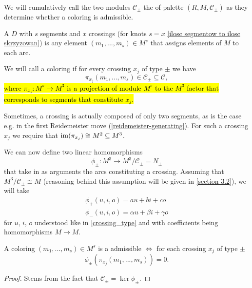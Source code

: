 We will cumulatively call the two modules $\mathcal{C}_\pm$ the  of palette $(R, M, \mathcal{C}_\pm)$ as they determine whether a coloring is admissible.

\begin{definition}
  A  $D$ with $s$ segments and $x$ crossings (for knots $s=x$ \cref{ilosc segmentow to ilosc skrzyzowan}) is any element $(m_1,..., m_s)\in M^s$ that assigns elements of $M$ to each arc. 

  We will call a coloring  if for every crossing $x_j$ of type $\pm$ we have 
  $$\pi_{x_j}(m_1,..., m_s)\in \mathcal{C}_\pm\subseteq\mathcal{C},$$
\hl{where $\pi_{x_j}:M^s\to M^3$ is a projection of module $M^s$ to the $M^3$ factor that corresponds to segments that constitute $x_j$.} 
\end{definition}

Sometimes, a crossing is actually composed of only two segments, as is the case e.g. in the first Reidemeister move (\cref{reidemeister-generating}). For such a crossing $x_j$ we require that $\operatorname{im}(\pi_{x_j})\cong M^2\subseteq M^3$.


We can now define two linear homomorphisms
$$\phi_\pm:M^3\to M^3/\mathcal{C}_\pm=N_\pm$$
that take in as arguments the arcs constituting a crossing. Assuming that $M^3/\mathcal{C}_\pm\cong M$ (reasoning behind this assumption will be given in \cref{section 3.2}), we will take 
\begin{align}
  \phi_+(u,i,o)=au+bi+co \label{phi equations1} \\ 
  \phi_-(u,i,o)=\alpha u+\beta i+\gamma o \label{phi equations2}
\end{align}
for $u$, $i$, $o$ understood like in \cref{crossing_type} and with coefficients being homomorphisms $M\to M$.

\begin{lemma}\label{proposition male kernel kolorowania}
  A coloring $(m_1,..., m_s)\in M^s$ is a admissible $\iff$ for each crossing $x_j$ of type $\pm$ 
  $$\phi_\pm(\pi_{x_j}(m_1,...,m_s))=0.$$
\end{lemma}

\begin{proof}
  Stems from the fact that $\mathcal{C}_\pm=\ker\phi_\pm$.
\end{proof}

